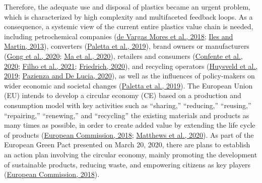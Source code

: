 \documentclass[12pt]{elsarticle} %
\begin{document}
Therefore, the adequate use and disposal of plastics became an urgent problem, which is characterized by high complexity and multifaceted feedback loops.
As a consequence, a systemic view of the current entire plastics value chain is needed, including petrochemical companies (\protect\hyperlink{ref-DeVargasMores2018}{de Vargas Mores et al., 2018}; \protect\hyperlink{ref-Iles2013}{Iles and Martin, 2013}), converters (\protect\hyperlink{ref-Paletta2019}{Paletta et al., 2019}), brand owners or manufacturers (\protect\hyperlink{ref-Gong2020}{Gong et al., 2020}; \protect\hyperlink{ref-Ma2020}{Ma et al., 2020}), retailers and consumers (\protect\hyperlink{ref-Confente2020}{Confente et al., 2020}; \protect\hyperlink{ref-Filho2021}{Filho et al., 2021}; \protect\hyperlink{ref-Friedrich2020}{Friedrich, 2020}), and recycling operators (\protect\hyperlink{ref-Huysveld2019}{Huysveld et al., 2019}; \protect\hyperlink{ref-Pazienza2020}{Pazienza and De Lucia, 2020}), as well as the influences of policy-makers on wider economic and societal changes (\protect\hyperlink{ref-Paletta2019}{Paletta et al., 2019}).
The European Union (EU) intends to develop a circular economy (CE) based on a production and consumption model with key activities such as ``sharing,'' ``reducing,'' ``reusing,'' ``repairing,'' ``renewing,'' and ``recycling'' the existing materials and products as many times as possible, in order to create added value by extending the life cycle of products (\protect\hyperlink{ref-EC2018}{European Commission, 2018}; \protect\hyperlink{ref-matthews2020}{Matthews et al., 2020}).
As part of the European Green Pact presented on March 20, 2020, there are plans to establish an action plan involving the circular economy, mainly promoting the development of sustainable products, reducing waste, and empowering citizens as key players (\protect\hyperlink{ref-EC2018}{European Commission, 2018}).
\end{document}

